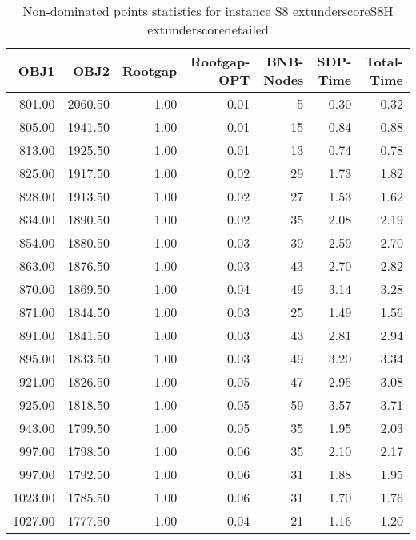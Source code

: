 \begin{table}
\caption{Non-dominated points statistics for instance S8	extunderscoreS8H	extunderscoredetailed}
\label{tab:stats/S8_S8H_detailed}
\begin{tabular}{rrrrrrr}
\toprule
OBJ1 & OBJ2 & Rootgap & Rootgap-OPT & BNB-Nodes & SDP-Time & Total-Time \\
\midrule
801.00 & 2060.50 & 1.00 & 0.01 & 5 & 0.30 & 0.32 \\
805.00 & 1941.50 & 1.00 & 0.01 & 15 & 0.84 & 0.88 \\
813.00 & 1925.50 & 1.00 & 0.01 & 13 & 0.74 & 0.78 \\
825.00 & 1917.50 & 1.00 & 0.02 & 29 & 1.73 & 1.82 \\
828.00 & 1913.50 & 1.00 & 0.02 & 27 & 1.53 & 1.62 \\
834.00 & 1890.50 & 1.00 & 0.02 & 35 & 2.08 & 2.19 \\
854.00 & 1880.50 & 1.00 & 0.03 & 39 & 2.59 & 2.70 \\
863.00 & 1876.50 & 1.00 & 0.03 & 43 & 2.70 & 2.82 \\
870.00 & 1869.50 & 1.00 & 0.04 & 49 & 3.14 & 3.28 \\
871.00 & 1844.50 & 1.00 & 0.03 & 25 & 1.49 & 1.56 \\
891.00 & 1841.50 & 1.00 & 0.03 & 43 & 2.81 & 2.94 \\
895.00 & 1833.50 & 1.00 & 0.03 & 49 & 3.20 & 3.34 \\
921.00 & 1826.50 & 1.00 & 0.05 & 47 & 2.95 & 3.08 \\
925.00 & 1818.50 & 1.00 & 0.05 & 59 & 3.57 & 3.71 \\
943.00 & 1799.50 & 1.00 & 0.05 & 35 & 1.95 & 2.03 \\
997.00 & 1798.50 & 1.00 & 0.06 & 35 & 2.10 & 2.17 \\
997.00 & 1792.50 & 1.00 & 0.06 & 31 & 1.88 & 1.95 \\
1023.00 & 1785.50 & 1.00 & 0.06 & 31 & 1.70 & 1.76 \\
1027.00 & 1777.50 & 1.00 & 0.04 & 21 & 1.16 & 1.20 \\
\bottomrule
\end{tabular}
\end{table}
